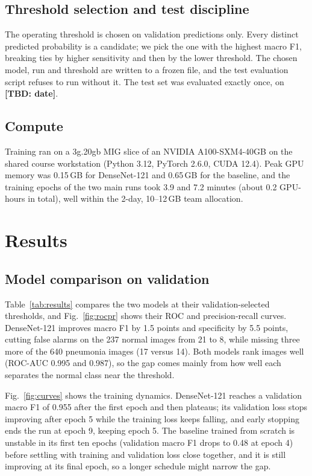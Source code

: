 \documentclass[conference]{IEEEtran}
\newcommand{\TBD}[1]{{\color{red}\textbf{[TBD: #1]}}}
\begin{document}
\subsection{Threshold selection and test discipline}
\label{sec:threshold}
The operating threshold is chosen on validation predictions only. Every distinct predicted probability is a candidate; we pick the one with the highest macro F1, breaking ties by higher sensitivity and then by the lower threshold. The chosen model, run and threshold are written to a frozen file, and the test evaluation script refuses to run without it. The test set was evaluated exactly once, on \TBD{date}.

\subsection{Compute}
Training ran on a 3g.20gb MIG slice of an NVIDIA A100-SXM4-40GB on the shared course workstation (Python 3.12, PyTorch 2.6.0, CUDA 12.4). Peak GPU memory was 0.15\,GB for DenseNet-121 and 0.65\,GB for the baseline, and the training epochs of the two main runs took 3.9 and 7.2 minutes (about 0.2 GPU-hours in total), well within the 2-day, 10--12\,GB team allocation.

\section{Results}
\label{sec:results}

\subsection{Model comparison on validation}
Table~\ref{tab:results} compares the two models at their validation-selected thresholds, and Fig.~\ref{fig:rocpr} shows their ROC and precision-recall curves. DenseNet-121 improves macro F1 by 1.5 points and specificity by 5.5 points, cutting false alarms on the 237 normal images from 21 to 8, while missing three more of the 640 pneumonia images (17 versus 14). Both models rank images well (ROC-AUC 0.995 and 0.987), so the gap comes mainly from how well each separates the normal class near the threshold.

Fig.~\ref{fig:curves} shows the training dynamics. DenseNet-121 reaches a validation macro F1 of 0.955 after the first epoch and then plateaus; its validation loss stops improving after epoch 5 while the training loss keeps falling, and early stopping ends the run at epoch 9, keeping epoch 5. The baseline trained from scratch is unstable in its first ten epochs (validation macro F1 drops to 0.48 at epoch 4) before settling with training and validation loss close together, and it is still improving at its final epoch, so a longer schedule might narrow the gap.
\end{document}
